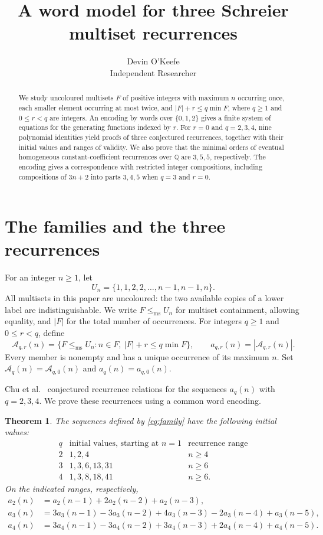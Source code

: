 \documentclass[11pt,a4paper]{article}
\title{A word model for three Schreier multiset recurrences}
\author{Devin O'Keefe\\\normalsize Independent Researcher}
\date{}
\newtheorem{theorem}{Theorem}[section]
\theoremstyle{remark}
\newcommand{\A}{\mathcal A}
\newcommand{\Q}{\mathbb Q}
\newcommand{\ms}{\mathrm{ms}}
\begin{document}
\maketitle
\begin{abstract}
We study uncoloured multisets $F$ of positive integers with maximum $n$
occurring once, each smaller element occurring at most twice, and
$|F|+r\le q\min F$, where $q\ge1$ and $0\le r<q$ are integers.
An encoding by words over $\{0,1,2\}$ gives a finite system of equations
for the generating functions indexed by $r$. For $r=0$ and $q=2,3,4$,
nine polynomial identities yield proofs of three conjectured recurrences,
together with their initial values and ranges of validity. We also prove
that the minimal orders of eventual homogeneous constant-coefficient
recurrences over $\Q$ are $3,5,5$, respectively. The encoding gives a
correspondence with restricted integer compositions, including compositions
of $3n+2$ into parts $3,4,5$ when $q=3$ and $r=0$.
\end{abstract}

\section{The families and the three recurrences}

For an integer $n\ge1$, let
\[
 U_n=\{1,1,2,2,\ldots,n-1,n-1,n\}.
\]
All multisets in this paper are uncoloured: the two available copies of a
lower label are indistinguishable. We write $F\le_{\ms}U_n$ for
multiset containment, allowing equality, and $|F|$ for the total number
of occurrences. For integers $q\ge1$ and $0\le r<q$, define
\begin{equation}\label{eq:family}
 \A_{q,r}(n)=\{F\le_{\ms}U_n:n\in F,\ |F|+r\le q\min F\},
 \qquad a_{q,r}(n)=|\A_{q,r}(n)|.
\end{equation}
Every member is nonempty and has a unique occurrence of its maximum $n$.
Set $\A_q(n)=\A_{q,0}(n)$ and $a_q(n)=a_{q,0}(n)$.

Chu et al.\ \cite[p.~19]{CGKMTV} conjectured recurrence relations for the
sequences $a_q(n)$ with $q=2,3,4$. We prove these recurrences using a
common word encoding.

\begin{theorem}\label{thm:main}
The sequences defined by \eqref{eq:family} have the following initial values:
\[
\begin{array}{c|c|c}
q&\text{initial values, starting at }n=1&\text{recurrence range}\\ \hline
2&1,2,4&n\ge4\\
3&1,3,6,13,31&n\ge6\\
4&1,3,8,18,41&n\ge6.
\end{array}
\]
On the indicated ranges, respectively,
\begin{align}
 a_2(n)&=a_2(n-1)+2a_2(n-2)+a_2(n-3),\label{eq:r2}\\
 a_3(n)&=3a_3(n-1)-3a_3(n-2)+4a_3(n-3)
          -2a_3(n-4)+a_3(n-5),\label{eq:r3}\\
 a_4(n)&=3a_4(n-1)-3a_4(n-2)+3a_4(n-3)
          +2a_4(n-4)+a_4(n-5).\label{eq:r4}
\end{align}
\end{theorem}
\end{document}

